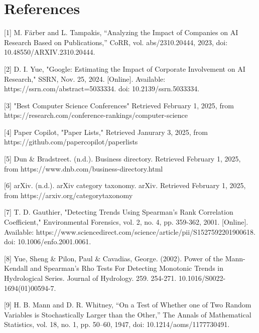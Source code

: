 \documentclass{article}
\begin{document}


\newpage
\section*{References}

[1] M. Färber and L. Tampakis, “Analyzing the Impact of Companies on AI Research Based on Publications,” CoRR, vol. abs/2310.20444, 2023, doi: 10.48550/ARXIV.2310.20444.

[2] D. I. Yue, "Google: Estimating the Impact of Corporate Involvement on AI Research," SSRN, Nov. 25, 2024. [Online]. Available: https://ssrn.com/abstract=5033334. doi: 10.2139/ssrn.5033334.

[3] "Best Computer Science Conferences" Retrieved February 1, 2025, from https://research.com/conference-rankings/computer-science

[4] Paper Copilot, "Paper Lists," Retrieved Janurary 3, 2025, from https://github.com/papercopilot/paperlists

[5] Dun \& Bradstreet. (n.d.). Business directory. Retrieved February 1, 2025, from https://www.dnb.com/business-directory.html

[6] arXiv. (n.d.). arXiv category taxonomy. arXiv. Retrieved February 1, 2025, from https://arxiv.org/category\textunderscore taxonomy

[7] T. D. Gauthier, "Detecting Trends Using Spearman's Rank Correlation Coefficient," Environmental Forensics, vol. 2, no. 4, pp. 359-362, 2001. [Online]. Available: https://www.sciencedirect.com/science/article/pii/S1527592201900618. doi: 10.1006/enfo.2001.0061.

[8] Yue, Sheng \& Pilon, Paul \& Cavadias, George. (2002). Power of the Mann-Kendall and Spearman's Rho Tests For Detecting Monotonic Trends in Hydrological Series. Journal of Hydrology. 259. 254-271. 10.1016/S0022-1694(01)00594-7. 

[9] H. B. Mann and D. R. Whitney, “On a Test of Whether one of Two Random Variables is Stochastically Larger than the Other,” The Annals of Mathematical Statistics, vol. 18, no. 1, pp. 50–60, 1947, doi: 10.1214/aoms/1177730491.
\end{document}
